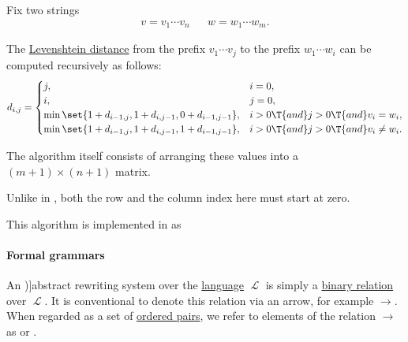 \begin{algorithm}\label{alg:wagner_fisher}
  Fix two strings
  \begin{align*}
    v = v_1 \cdots v_n && w = w_1 \cdots w_m.
  \end{align*}

  The \hyperref[def:levenshtein_distance]{Levenshtein distance} from the prefix \( v_1 \cdots v_j \) to the prefix \( w_1 \cdots w_i \) can be computed recursively as follows:
  \begin{equation*}
    d_{i,j} = \begin{cases}
      j,                                                         &i = 0, \\
      i,                                                         &j = 0, \\
      \min\set{ 1 + d_{i-1,j}, 1 + d_{i,j-1}, 0 + d_{i-1,j-1} }, &i > 0 \T{and} j > 0 \T{and} v_i = w_i, \\
      \min\set{ 1 + d_{i-1,j}, 1 + d_{i,j-1}, 1 + d_{i-1,j-1} }, &i > 0 \T{and} j > 0 \T{and} v_i \neq w_i.
    \end{cases}
  \end{equation*}

  The algorithm itself consists of arranging these values into a \( (m + 1) \times (n + 1) \) matrix.
\end{algorithm}
\begin{comments}
  \item Unlike in , both the row and the column index here must start at zero.
  \item This algorithm is implemented in \cite{notebook:code} as
  \begin{CodeRefDisplay}
  \end{CodeRefDisplay}
\end{comments}

\paragraph{Formal grammars}

\begin{definition}\label{def:rewriting_system}
  An \term[en=rewriting system (\cite[6]{Salomaa1973FormalLanguages})]{abstract rewriting system} over the \hyperref[def:formal_language/language]{language} \( \mscrL \) is simply a \hyperref[def:binary_relation]{binary relation} over \( \mscrL \). It is conventional to denote this relation via an arrow, for example \( {\to} \). When regarded as a set of \hyperref[def:ordered_tuple]{ordered pairs}, we refer to elements of the relation \( {\to} \) as  or .
\end{definition}

